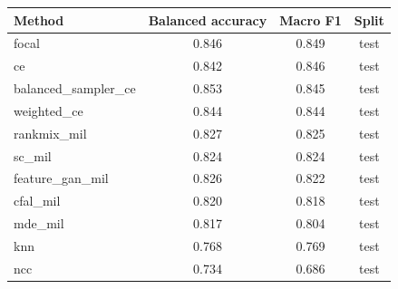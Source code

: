 \begin{tabular}{lccc}
\toprule
Method & Balanced accuracy & Macro F1 & Split\\
\midrule
focal & 0.846 & 0.849 & test\\
ce & 0.842 & 0.846 & test\\
balanced\_sampler\_ce & 0.853 & 0.845 & test\\
weighted\_ce & 0.844 & 0.844 & test\\
rankmix\_mil & 0.827 & 0.825 & test\\
sc\_mil & 0.824 & 0.824 & test\\
feature\_gan\_mil & 0.826 & 0.822 & test\\
cfal\_mil & 0.820 & 0.818 & test\\
mde\_mil & 0.817 & 0.804 & test\\
knn & 0.768 & 0.769 & test\\
ncc & 0.734 & 0.686 & test\\
\bottomrule
\end{tabular}
